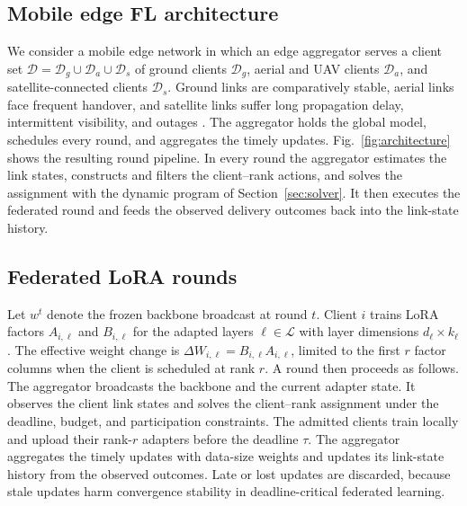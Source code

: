 \documentclass[preprint,12pt]{elsarticle}
\begin{document}
\subsection{Mobile edge FL architecture}
We consider a mobile edge network in which an edge aggregator serves a client set
$\mathcal{D}=\mathcal{D}_g\cup\mathcal{D}_a\cup\mathcal{D}_s$ of ground clients $\mathcal{D}_g$, aerial and UAV clients $\mathcal{D}_a$, and satellite-connected clients $\mathcal{D}_s$. Ground links are comparatively stable, aerial links face frequent handover, and satellite links suffer long propagation delay, intermittent visibility, and outages \cite{mahboob2024ntn,razmi2022ground}. The aggregator holds the global model, schedules every round, and aggregates the timely updates. Fig.~\ref{fig:architecture} shows the resulting round pipeline. In every round the aggregator estimates the link states, constructs and filters the client--rank actions, and solves the assignment with the dynamic program of Section~\ref{sec:solver}. It then executes the federated round and feeds the observed delivery outcomes back into the link-state history.

\subsection{Federated LoRA rounds}
Let $w^t$ denote the frozen backbone broadcast at round $t$. Client $i$ trains LoRA factors $A_{i,\ell}$ and $B_{i,\ell}$ for the adapted layers $\ell\in\mathcal L$ with layer dimensions $d_\ell\times k_\ell$. The effective weight change is $\Delta W_{i,\ell}=B_{i,\ell}A_{i,\ell}$, limited to the first $r$ factor columns when the client is scheduled at rank $r$. A round then proceeds as follows. The aggregator broadcasts the backbone and the current adapter state. It observes the client link states and solves the client--rank assignment under the deadline, budget, and participation constraints. The admitted clients train locally and upload their rank-$r$ adapters before the deadline $\tau$. The aggregator aggregates the timely updates with data-size weights and updates its link-state history from the observed outcomes. Late or lost updates are discarded, because stale updates harm convergence stability in deadline-critical federated learning.
\end{document}
